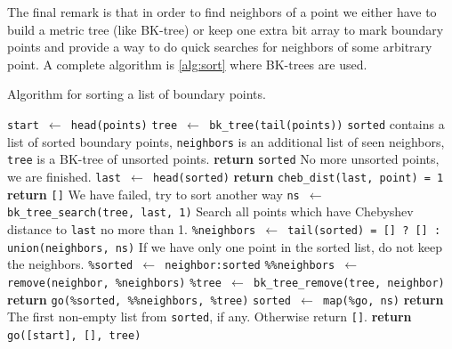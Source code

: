 \documentclass[reprint,amsmath,amssymb,aps,pre,showkeys,showpacs]{revtex4-1}
\begin{document}
The final remark is that in order to find neighbors of a point we either have to
build a metric tree (like BK-tree) or keep one extra bit array to mark boundary
points and provide a way to do quick searches for neighbors of some arbitrary
point. A complete algorithm is \cref{alg:sort} where BK-trees are used.
\begin{algorithm}[H]
  \caption{Algorithm for sorting a list of boundary points.}
  \label{alg:sort}
  \begin{algorithmic}[1]
    \State \texttt{start $\gets$ head(points)}
    \State \texttt{tree $\gets$ bk\_tree(tail(points))}
    \Comment \texttt{sorted} contains a list of sorted boundary points,
    \texttt{neighbors} is an additional list of seen neighbors, \texttt{tree} is
    a BK-tree of unsorted points.
    \State \textbf{return} \texttt{sorted}
    \Comment No more unsorted points, we are finished.
    \EndIf
    \State \texttt{last $\gets$ head(sorted)}
    \State \textbf{return} \texttt{cheb\_dist(last, point) = 1}
    \EndProcedure
    \State \textbf{return} \texttt{[]}
    \Comment We have failed, try to sort another way
    \EndIf
    \State \texttt{ns $\gets$ bk\_tree\_search(tree, last, 1)}
    \Comment Search all points which have Chebyshev distance to \texttt{last} no
    more than 1.
    \State \texttt{\%neighbors $\gets$ tail(sorted) = [] ? [] : union(neighbors, ns)}
    \Comment If we have only one point in the sorted list, do not keep the
    neighbors.
    \State \texttt{\%sorted $\gets$ neighbor:sorted}
    \State \texttt{\%\%neighbors $\gets$ remove(neighbor, \%neighbors)}
    \State \texttt{\%tree $\gets$ bk\_tree\_remove(tree, neighbor)}
    \State \textbf{return} \texttt{go(\%sorted, \%\%neighbors, \%tree)}
    \EndProcedure
    \State \texttt{sorted $\gets$ map(\%go, ns)}
    \State \textbf{return} The first non-empty list from \texttt{sorted}, if
    any. Otherwise return \texttt{[]}.
    \EndProcedure
    \State \textbf{return} \texttt{go([start], [], tree)}
    \EndProcedure
  \end{algorithmic}
\end{algorithm}
\end{document}
